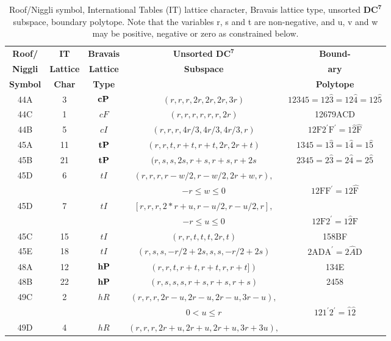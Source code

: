 \documentclass[preprint]{iucr}              %
\numberwithin{equation}{section}
\begin{document}
\begin{table}
	\caption{Roof/Niggli symbol, International Tables (IT) lattice character, Bravais lattice type, unsorted ${\mathbf{DC}^{\mathbf{7}}}$ subspace, boundary polytope.
		Note that the variables r, s and t are non-negative, and u, v and w may be
		positive, negative or zero as constrained below.}
	\begin{center}
		\begin{tabular}{|c|c|c|c|c|}
			\hline
			{\bf Roof/}     &{\bf IT}&{\bf Bravais}&{\bf Unsorted ${\mathbf{DC}^{\mathbf{7}}}$}&{\bf Bound-}\\
			{\bf Niggli}&{\bf Lattice}&{\bf Lattice}&{\bf Subspace}&{\bf ary}\\
			{\bf Symbol}&{\bf Char}&{\bf Type}&                             & {\bf Polytope} \\
			\hline
			44A&3&${\bf cP}$&$(r,r,r,2r,2r,2r,3r)$&$12345\!=\!12\hat{3}\!=\!12\hat{4}\!=\!12\hat{5}$\\
			\hline
			44C&1&$cF$&$(r,r,r,r,r,r,2r)$&12679ACD\\
			\hline
			44B&5&$cI$&$(r,r,r,4 r/3,4 r/3, 4 r/3,r)$&$\text{12F2}^{\prime} \text{F}^{\prime} = 1\hat{2}\hat{\text{F}}$\\
			\hline
			45A&11&${\bf tP}$&$(r,r,t,r+t,r+t,2r,2r+t)$&$1345 = 1\hat{3} = 1\hat{4} = 1\hat{5}$\\
			45B&21&${\bf tP}$&$(r,s,s,2s,r+s,r+s,r+2s$&$2345 = 2\hat{3} = 2\hat{4} = 2\hat{5}$\\
			\hline
			45D&6&$tI$&$(r,r,r,r-w/2,r-w/2,2r+w,r),$&\\
			&&&$-r \leq w \leq 0$&$\text{12FF}^{\prime} = 12\hat{\text{F}}$\\
			45D&7&$tI$&$[r,r,r,2*r+u,r-u/2,r-u/2,r],$&\\
			&&&$-r \leq u \leq 0$&$\text{12F2}^{\prime} = 1{\hat{2}}\text{F}$\\
			45C&15&$tI$&$(r,r,t,t,t,2r,t)$&158BF\\
			45E&18&$tI$&$(r,s,s,-r/2+2s,s,s,-r/2+2s)$&$\text{2ADA}^{\prime}  = 2{\hat{A}}\text{D}$\\
			\hline
			48A&12&${\bf hP}$&$(r,r,t,r+t,r+t,r,r+t])$&134E\\
			48B&22&${\bf hP}$&$(r,s,s,s,r+s,r+s,r+s)$&2458\\
			\hline
			49C&2&$hR$&$(r,r,r,2r-u,2r-u,2r-u,3r-u),$&\\
			&&&$0 < u \leq r$&$121^\prime 2^\prime = \hat{1}\hat{2}$\\
			49D&4&$hR$&$(r,r,r,2r+u,2r+u,2r+u,3r+3u),$&\\

\end{tabular}
\end{center}
\end{table}
\end{document}
